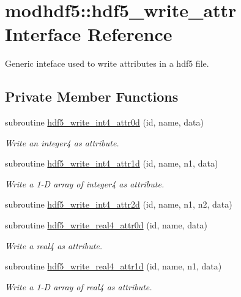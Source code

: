\hypertarget{interfacemodhdf5_1_1hdf5__write__attr}{\section{modhdf5\-:\-:hdf5\-\_\-write\-\_\-attr Interface Reference}
\label{interfacemodhdf5_1_1hdf5__write__attr}
}


Generic inteface used to write attributes in a hdf5 file.  


\subsection*{Private Member Functions}
\begin{DoxyCompactItemize}
\item 
subroutine \hyperlink{interfacemodhdf5_1_1hdf5__write__attr_a3959ef2486c4c456e76584168da85aba}{hdf5\-\_\-write\-\_\-int4\-\_\-attr0d} (id, name, data)
\begin{DoxyCompactList}\small\item\em Write an integer4 as attribute. \end{DoxyCompactList}\item 
subroutine \hyperlink{interfacemodhdf5_1_1hdf5__write__attr_aa621d5efc77049d6ee8dab8b8a1e7ebe}{hdf5\-\_\-write\-\_\-int4\-\_\-attr1d} (id, name, n1, data)
\begin{DoxyCompactList}\small\item\em Write a 1-\/\-D array of integer4 as attribute. \end{DoxyCompactList}\item 
subroutine \hyperlink{interfacemodhdf5_1_1hdf5__write__attr_a38454d655e553e07bfaba67da14fd578}{hdf5\-\_\-write\-\_\-int4\-\_\-attr2d} (id, name, n1, n2, data)
\item 
subroutine \hyperlink{interfacemodhdf5_1_1hdf5__write__attr_adb6eff5c1284cf4fed9bd8a331a219fd}{hdf5\-\_\-write\-\_\-real4\-\_\-attr0d} (id, name, data)
\begin{DoxyCompactList}\small\item\em Write a real4 as attribute. \end{DoxyCompactList}\item 
subroutine \hyperlink{interfacemodhdf5_1_1hdf5__write__attr_a962f1050530d43822075bb646e631411}{hdf5\-\_\-write\-\_\-real4\-\_\-attr1d} (id, name, n1, data)
\begin{DoxyCompactList}\small\item\em Write a 1-\/\-D array of real4 as attribute. \end{DoxyCompactList}\item 

\end{DoxyCompactItemize}
